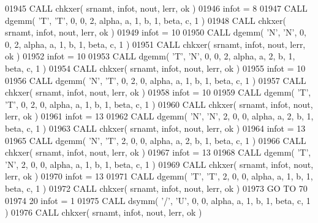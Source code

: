 \begin{DoxyCode}
01945       \textcolor{keyword}{CALL }chkxer( srnamt, infot, nout, lerr, ok )
01946       infot = 8
01947       \textcolor{keyword}{CALL }dgemm( \textcolor{stringliteral}{'T'}, \textcolor{stringliteral}{'T'}, 0, 0, 2, alpha, a, 1, b, 1, beta, c, 1 )
01948       \textcolor{keyword}{CALL }chkxer( srnamt, infot, nout, lerr, ok )
01949       infot = 10
01950       \textcolor{keyword}{CALL }dgemm( \textcolor{stringliteral}{'N'}, \textcolor{stringliteral}{'N'}, 0, 0, 2, alpha, a, 1, b, 1, beta, c, 1 )
01951       \textcolor{keyword}{CALL }chkxer( srnamt, infot, nout, lerr, ok )
01952       infot = 10
01953       \textcolor{keyword}{CALL }dgemm( \textcolor{stringliteral}{'T'}, \textcolor{stringliteral}{'N'}, 0, 0, 2, alpha, a, 2, b, 1, beta, c, 1 )
01954       \textcolor{keyword}{CALL }chkxer( srnamt, infot, nout, lerr, ok )
01955       infot = 10
01956       \textcolor{keyword}{CALL }dgemm( \textcolor{stringliteral}{'N'}, \textcolor{stringliteral}{'T'}, 0, 2, 0, alpha, a, 1, b, 1, beta, c, 1 )
01957       \textcolor{keyword}{CALL }chkxer( srnamt, infot, nout, lerr, ok )
01958       infot = 10
01959       \textcolor{keyword}{CALL }dgemm( \textcolor{stringliteral}{'T'}, \textcolor{stringliteral}{'T'}, 0, 2, 0, alpha, a, 1, b, 1, beta, c, 1 )
01960       \textcolor{keyword}{CALL }chkxer( srnamt, infot, nout, lerr, ok )
01961       infot = 13
01962       \textcolor{keyword}{CALL }dgemm( \textcolor{stringliteral}{'N'}, \textcolor{stringliteral}{'N'}, 2, 0, 0, alpha, a, 2, b, 1, beta, c, 1 )
01963       \textcolor{keyword}{CALL }chkxer( srnamt, infot, nout, lerr, ok )
01964       infot = 13
01965       \textcolor{keyword}{CALL }dgemm( \textcolor{stringliteral}{'N'}, \textcolor{stringliteral}{'T'}, 2, 0, 0, alpha, a, 2, b, 1, beta, c, 1 )
01966       \textcolor{keyword}{CALL }chkxer( srnamt, infot, nout, lerr, ok )
01967       infot = 13
01968       \textcolor{keyword}{CALL }dgemm( \textcolor{stringliteral}{'T'}, \textcolor{stringliteral}{'N'}, 2, 0, 0, alpha, a, 1, b, 1, beta, c, 1 )
01969       \textcolor{keyword}{CALL }chkxer( srnamt, infot, nout, lerr, ok )
01970       infot = 13
01971       \textcolor{keyword}{CALL }dgemm( \textcolor{stringliteral}{'T'}, \textcolor{stringliteral}{'T'}, 2, 0, 0, alpha, a, 1, b, 1, beta, c, 1 )
01972       \textcolor{keyword}{CALL }chkxer( srnamt, infot, nout, lerr, ok )
01973       \textcolor{keywordflow}{GO TO} 70
01974    20 infot = 1
01975       \textcolor{keyword}{CALL }dsymm( \textcolor{stringliteral}{'/'}, \textcolor{stringliteral}{'U'}, 0, 0, alpha, a, 1, b, 1, beta, c, 1 )
01976       \textcolor{keyword}{CALL }chkxer( srnamt, infot, nout, lerr, ok )

\end{DoxyCode}
